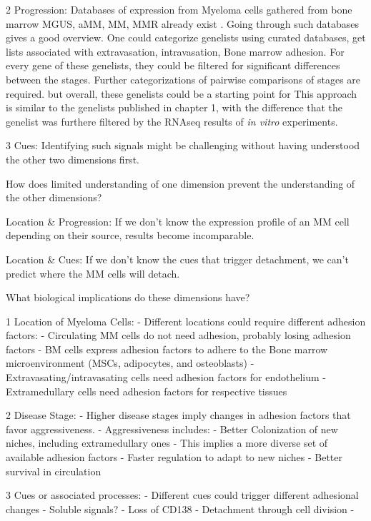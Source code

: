 2 Progression: Databases of expression from Myeloma cells gathered from bone
marrow \ac{MGUS}, \ac{aMM}, \ac{MM}, \ac{MMR} already exist
\citet{akhmetzyanovaDynamicCD138Surface2020,
      seckingerCD38ImmunotherapeuticTarget2018}. Going through such databases gives a
good overview. One could categorize genelists using curated databases, get lists
associated with extravasation, intravasation, Bone marrow adhesion. For every
gene of these genelists, they could be filtered for significant differences
between the stages. Further categorizations of pairwise comparisons of stages
are required. but overall, these genelists could be a starting point for This
approach is similar to the genelists published in chapter 1, with the difference
that the genelist was furthere filtered by the RNAseq results of \textit{in
      vitro} experiments.

3 Cues: Identifying such signals might be challenging without
having understood the other two dimensions first.


How does limited understanding of one dimension prevent the understanding of the
other dimensions?

Location \& Progression: If we don't know the expression profile of an MM cell depending on their 
source, results become incomparable.

Location \& Cues: If we don't know the cues that trigger detachment, we can't
predict where the MM cells will detach.




What biological implications do these dimensions have?

1 Location of Myeloma Cells:
- Different locations could require different adhesion factors:
- Circulating MM cells do not need adhesion, probably losing adhesion factors
- BM cells express adhesion factors to adhere to the Bone marrow microenvironment (MSCs, adipocytes, and osteoblasts)
- Extravasating/intravasating cells need adhesion factors for endothelium
- Extramedullary cells need adhesion factors for respective tissues

2 Disease Stage:
- Higher disease stages imply changes in adhesion factors that favor aggressiveness.
- Aggressiveness includes:
- Better Colonization of new niches, including extramedullary ones
- This implies a more diverse set of available adhesion factors
- Faster regulation to adapt to new niches
- Better survival in circulation

3 Cues or associated processes:
- Different cues could trigger different adhesional changes
- Soluble signals?
- Loss of CD138 \cite{akhmetzyanovaDynamicCD138Surface2020}
- Detachment through cell division
-


